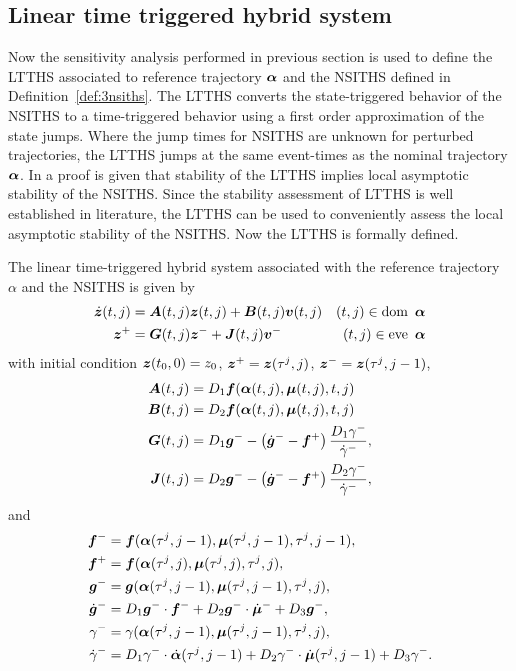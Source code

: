 \documentclass[../DC2017114Bouma.tex]{subfiles}
\begin{document}
\subsection{Linear time triggered hybrid system}
Now the sensitivity analysis performed in previous section is used to define the LTTHS associated to reference trajectory $\boldsymbol{\alpha}$ and the NSITHS defined in Definition~\ref{def:3nsiths}. The LTTHS converts the state-triggered behavior of the NSITHS to a time-triggered behavior using a first order approximation of the state jumps. Where the jump times for NSITHS are unknown for perturbed trajectories, the LTTHS jumps at the same event-times as the nominal trajectory $\boldsymbol{\alpha}$. In \cite{Rijnen2017} a proof is given that stability of the LTTHS implies local asymptotic stability of the NSITHS. Since the stability assessment of LTTHS is well established in literature, the LTTHS can be used to conveniently assess the local asymptotic stability of the NSITHS. Now the LTTHS is formally defined.
\begin{mydef}[LTTHS]\label{def:3ltths}
The linear time-triggered hybrid system associated with the reference trajectory $\alpha$ and the NSITHS is given by
\begin{align}
\dot{{\boldsymbol{z}}}(t,j) &= {\boldsymbol{A}}(t,j){\boldsymbol{z}}(t,j) + {\boldsymbol{B}}(t,j){\boldsymbol{v}}(t,j) &(t,j)\in \operatorname{\textnormal{dom}}\ \boldsymbol{\alpha}\\
{\boldsymbol{z}}^+ &= {\boldsymbol{G}}(t,j){\boldsymbol{z}}^- + {\boldsymbol{J}}(t,j){\boldsymbol{v}}^- &(t,j)\in \operatorname{\textnormal{eve}}\ \boldsymbol{\alpha}
\end{align}
with initial condition ${\boldsymbol{z}}(t_0,0)=z_0$, ${\boldsymbol{z}}^+ = {\boldsymbol{z}}(\tau^j,j)$, ${\boldsymbol{z}}^- = {\boldsymbol{z}}(\tau^j,j-1)$,
\begin{align}
{\boldsymbol{A}}(t,j) &= D_1{\boldsymbol{f}}(\boldsymbol{\alpha}(t,j),\boldsymbol{\mu}(t,j),t,j)\\
{\boldsymbol{B}}(t,j) &= D_2{\boldsymbol{f}}(\boldsymbol{\alpha}(t,j),\boldsymbol{\mu}(t,j),t,j)\\
{\boldsymbol{G}}(t,j) & = D_1{\boldsymbol{g}}^- - \left(\dot{{\boldsymbol{g}}}^- - {\boldsymbol{f}}^+\right)\frac{D_1\gamma^-}{\dot{\gamma}^-},\\
{\boldsymbol{J}}(t,j) & = D_2{\boldsymbol{g}}^- - \left(\dot{{\boldsymbol{g}}}^- - {\boldsymbol{f}}^+\right)\frac{D_2\gamma^-}{\dot{\gamma}^-},
\end{align}
and
\begin{align}
{\boldsymbol{f}}^- &= {\boldsymbol{f}}(\boldsymbol{\alpha}(\tau^j,j-1),\boldsymbol{\mu}(\tau^j,j-1),\tau^j,j-1),\\
{\boldsymbol{f}}^+ &= {\boldsymbol{f}}(\boldsymbol{\alpha}(\tau^j,j),\boldsymbol{\mu}(\tau^j,j),\tau^j,j),\\
{\boldsymbol{g}}^- &= {\boldsymbol{g}}(\boldsymbol{\alpha}(\tau^j,j-1),\boldsymbol{\mu}(\tau^j,j-1),\tau^j,j),\\
\dot{{\boldsymbol{g}}}^- &= D_1{\boldsymbol{g}}^-\cdot {\boldsymbol{f}}^- + D_2{\boldsymbol{g}}^-\cdot \dot{\boldsymbol{\mu}}^- + D_3{\boldsymbol{g}}^-,\\
\gamma^- &= \gamma(\boldsymbol{\alpha}(\tau^j,j-1),\boldsymbol{\mu}(\tau^j,j-1),\tau^j,j),\\
\dot{\gamma}^- &= D_1\gamma^-\cdot\dot{\boldsymbol{\alpha}}(\tau^j,j-1) + D_2\gamma^-\cdot\dot{\boldsymbol{\mu}}(\tau^j,j-1) + D_3\gamma^-.
\end{align}
\end{mydef}
\end{document}

